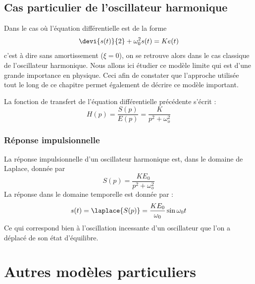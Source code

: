 \subsection{Cas particulier de l'oscillateur harmonique}

Dans le cas où l'équation différentielle est de la forme 
$$
\devi{s(t)}{2}+\omega_0^2 s(t)=Ke(t)
$$
c'est à dire sans amortissement ($\xi=0$), on se retrouve alors dans le 
cas classique de l'oscillateur harmonique.
Nous allons ici étudier ce modèle limite qui est d'une grande importance en physique.
Ceci afin de constater que l'approche utilisée tout le long de ce chapitre
permet également de décrire ce modèle important. 

La fonction de transfert de l'équation différentielle précédente s'écrit :
$$
H(p)=\dfrac{S(p)}{E(p)}=\dfrac{K}{p^2+\omega_o^2}
$$

\subsubsection{Réponse impulsionnelle}
La réponse impulsionnelle d'un oscillateur harmonique est, dans le domaine de Laplace,
donnée par 
$$
S(p)=\dfrac{KE_0}{p^2+\omega_o^2}
$$
La réponse dans le domaine temporelle est donnée par :
$$
s(t)=\laplace{S(p)}=\dfrac{KE_0}{\omega_0}\sin{\omega_0t}
$$
Ce qui correspond bien à l'oscillation incessante d'un oscillateur que l'on a 
déplacé de son état d'équilibre.

\newpage
\section{Autres modèles particuliers}

